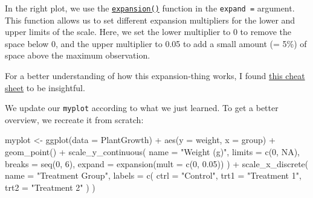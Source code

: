 \documentclass[
  letterpaper,
  DIV=11,
  numbers=noendperiod]{scrartcl}
\newenvironment{Shaded}{\begin{snugshade}}{\end{snugshade}}
\newcommand{\AttributeTok}[1]{\textcolor[rgb]{0.40,0.45,0.13}{#1}}
\newcommand{\ConstantTok}[1]{\textcolor[rgb]{0.56,0.35,0.01}{#1}}
\newcommand{\DecValTok}[1]{\textcolor[rgb]{0.68,0.00,0.00}{#1}}
\newcommand{\FloatTok}[1]{\textcolor[rgb]{0.68,0.00,0.00}{#1}}
\newcommand{\FunctionTok}[1]{\textcolor[rgb]{0.28,0.35,0.67}{#1}}
\newcommand{\NormalTok}[1]{\textcolor[rgb]{0.00,0.23,0.31}{#1}}
\newcommand{\OtherTok}[1]{\textcolor[rgb]{0.00,0.23,0.31}{#1}}
\newcommand{\SpecialCharTok}[1]{\textcolor[rgb]{0.37,0.37,0.37}{#1}}
\newcommand{\StringTok}[1]{\textcolor[rgb]{0.13,0.47,0.30}{#1}}
\begin{document}
In the right plot, we use the
\href{https://ggplot2.tidyverse.org/reference/expansion.html}{\texttt{expansion()}}
function in the \texttt{expand\ =} argument. This function allows us to
set different expansion multipliers for the lower and upper limits of
the scale. Here, we set the lower multiplier to 0 to remove the space
below 0, and the upper multiplier to 0.05 to add a small amount (= 5\%)
of space above the maximum observation.

\begin{tcolorbox}[enhanced jigsaw, coltitle=black, colbacktitle=quarto-callout-tip-color!10!white, titlerule=0mm, rightrule=.15mm, toprule=.15mm, left=2mm, arc=.35mm, colframe=quarto-callout-tip-color-frame, bottomrule=.15mm, toptitle=1mm, breakable, colback=white, bottomtitle=1mm, title=\textcolor{quarto-callout-tip-color}{\faLightbulb}\hspace{0.5em}{Tip}, opacitybacktitle=0.6, leftrule=.75mm, opacityback=0]

For a better understanding of how this expansion-thing works, I found
\href{https://twitter.com/ChBurkhart/status/1492087527511052290}{this
cheat sheet} to be insightful.

\end{tcolorbox}

We update our \texttt{myplot} according to what we just learned. To get
a better overview, we recreate it from scratch:

\begin{Shaded}
\begin{Highlighting}[]
\NormalTok{myplot }\OtherTok{\textless{}{-}} \FunctionTok{ggplot}\NormalTok{(}\AttributeTok{data =}\NormalTok{ PlantGrowth) }\SpecialCharTok{+}
  \FunctionTok{aes}\NormalTok{(}\AttributeTok{y =}\NormalTok{ weight, }\AttributeTok{x =}\NormalTok{ group) }\SpecialCharTok{+}
  \FunctionTok{geom\_point}\NormalTok{() }\SpecialCharTok{+}
  \FunctionTok{scale\_y\_continuous}\NormalTok{(}
    \AttributeTok{name =} \StringTok{"Weight (g)"}\NormalTok{,}
    \AttributeTok{limits =} \FunctionTok{c}\NormalTok{(}\DecValTok{0}\NormalTok{, }\ConstantTok{NA}\NormalTok{),}
    \AttributeTok{breaks =} \FunctionTok{seq}\NormalTok{(}\DecValTok{0}\NormalTok{, }\DecValTok{6}\NormalTok{),}
    \AttributeTok{expand =} \FunctionTok{expansion}\NormalTok{(}\AttributeTok{mult =} \FunctionTok{c}\NormalTok{(}\DecValTok{0}\NormalTok{, }\FloatTok{0.05}\NormalTok{))}
\NormalTok{  ) }\SpecialCharTok{+}
  \FunctionTok{scale\_x\_discrete}\NormalTok{(}
    \AttributeTok{name =} \StringTok{"Treatment Group"}\NormalTok{,}
    \AttributeTok{labels =} \FunctionTok{c}\NormalTok{(}
      \AttributeTok{ctrl =} \StringTok{"Control"}\NormalTok{, }
      \AttributeTok{trt1 =} \StringTok{"Treatment 1"}\NormalTok{, }
      \AttributeTok{trt2 =} \StringTok{"Treatment 2"}
\NormalTok{    )}
\NormalTok{  )}
\end{Highlighting}
\end{Shaded}
\end{document}
